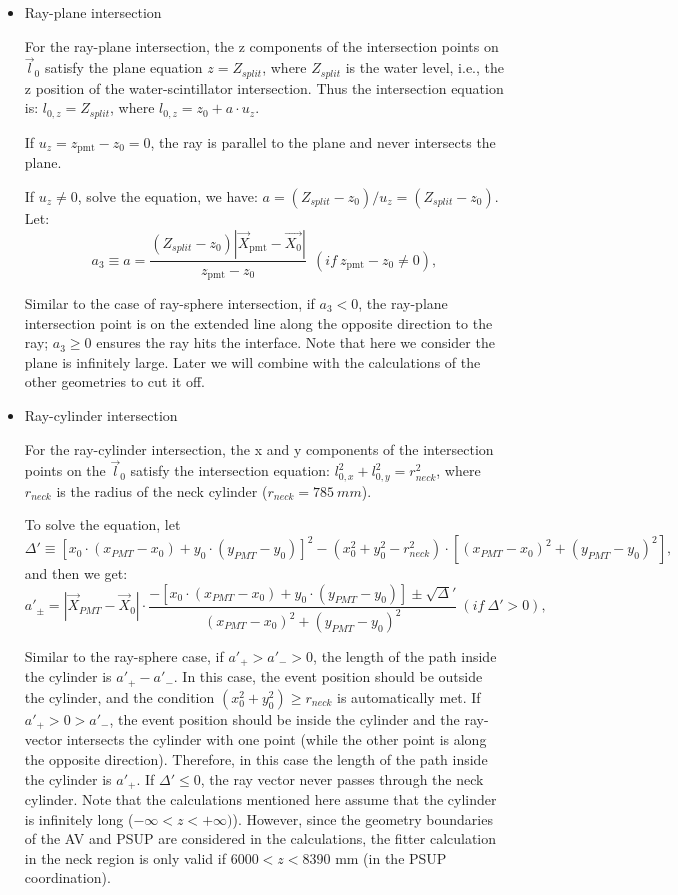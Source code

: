 \begin{itemize}
\item Ray-plane intersection

For the ray-plane intersection, the z components of the intersection points on $\vec{l}_0$ satisfy the plane equation $z=Z_{split}$, where $Z_{split}$ is the water level, i.e., the z position of the water-scintillator intersection. Thus the intersection equation is:
$l_{0,z}=Z_{split}$, where $l_{0,z}=z_0+a\cdot u_z$.

If $u_z=z_\mathrm{pmt}-z_0=0$, the ray is parallel to the plane and never intersects the plane.

If $u_z\neq 0$, solve the equation, we have: $a=(Z_{split}-z_0)/u_z=(Z_{split}-z_0)$.
Let: 
\begin{equation}
a_3 \equiv a = \frac{(Z_{split}-z_0)|\vec{X}_{\mathrm{pmt}}-\vec{X_0}|}{z_\mathrm{pmt}-z_0}~~(if ~z_\mathrm{pmt}-z_0\neq 0),
\end{equation}

Similar to the case of ray-sphere intersection, if $a_3<0$, the ray-plane intersection point is on the extended line along the opposite direction to the ray; $a_3 \geq 0$ ensures the ray hits the interface. Note that here we consider the plane is infinitely large. Later we will combine with the calculations of the other geometries to cut it off. 

\item Ray-cylinder intersection

For the ray-cylinder intersection, the x and y components of the intersection points on the $\vec l_0$ satisfy the intersection equation: $l^2_{0,x}+l^2_{0,y} = r^2_{neck}$, where $r_{neck}$ is the radius of the neck cylinder ($r_{neck}=785~mm$).

To solve the equation, let 
\begin{equation*}
\Delta'\equiv [x_0\cdot (x_{PMT}-x_0)+y_0\cdot(y_{PMT}-y_0)]^2 - ( x_0^2+y_0^2-r^2_{neck})\cdot [(x_{PMT}-x_0)^2+(y_{PMT}-y_0)^2], 
\end{equation*}
and then we get: 
\begin{equation}\label{eq:ray-cylinder}
a'_{\pm} = |\vec{X}_{PMT}-\vec{X}_0|\cdot\frac{-[x_0\cdot (x_{PMT}-x_0)+y_0\cdot(y_{PMT}-y_0)] \pm \sqrt\Delta' }{(x_{PMT}-x_0)^2+(y_{PMT}-y_0)^2}~(if~\Delta'>0),
\end{equation}

Similar to the ray-sphere case, if $a'_{+}>a'_->0$, the length of the path inside the cylinder is $a'_+-a'_-$. In this case, the event position should be outside the cylinder, and the condition $(x^2_0+y^2_0)\geq r_{neck}$ is automatically met. If $a'_+>0>a'_-$, the event position should be inside the cylinder and the ray-vector intersects the cylinder with one point (while the other point is along the opposite direction). Therefore, in this case the length of the path inside the cylinder is $a'_+$. If $\Delta'\leq0$, the ray vector never passes through the neck cylinder. Note that the calculations mentioned here assume that the cylinder is infinitely long ($-\infty<z<+\infty)$). However, since the geometry boundaries of the AV and PSUP are considered in the calculations, the fitter calculation in the neck region is only valid if $6000<z<8390$ mm (in the PSUP coordination).


\end{itemize}
